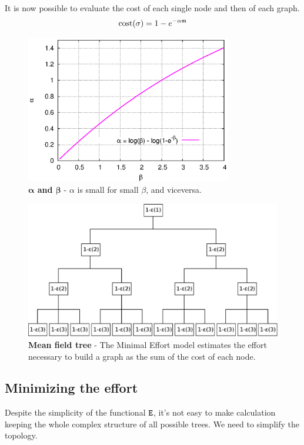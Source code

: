 It is now possible to evaluate the cost of each single node and then of each graph.
\[ \text{cost}(\sigma) = 1 - e^{-\alpha \mathfrak m} \]
\begin{figure}[ht]%
\center
\includegraphics[width=9cm,draft=false]{grafici/alphabeta.eps}
\caption{\label{alphabeta} \footnotesize\textbf{$\boldsymbol{\alpha}$ and $\boldsymbol{\beta}$} - $\alpha$ is small for small $\beta$, and viceversa. }
\end{figure}

\newpage
\vphantom{ciao}
\vspace{5cm}
\begin{figure}[H]%
\center
\includegraphics[width=\textwidth,draft=false]{images/effort2.eps}
\caption{\label{effort} \footnotesize\textbf{Mean field tree} - The Minimal Effort model estimates the effort necessary to build a graph as the sum of the cost of each node. }
\end{figure}
\newpage


\subsection{Minimizing the effort}
Despite the simplicity of the functional $\mathtt E$, it's not easy to make calculation keeping the whole complex structure of all possible trees. We need to simplify the topology.

